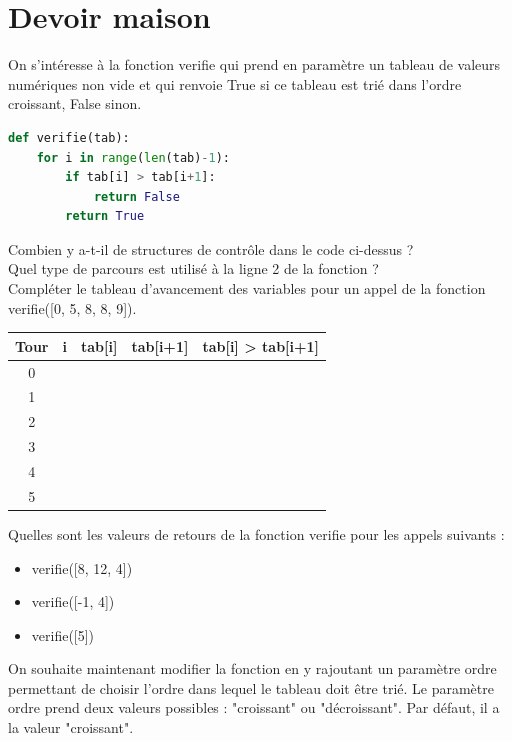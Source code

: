 \section*{Devoir maison }

On s'intéresse à la fonction verifie qui prend en paramètre un tableau de valeurs numériques non vide et qui renvoie True si ce tableau est trié dans l’ordre croissant, False sinon.

\begin{lstlisting}[language=Python]
def verifie(tab):
    for i in range(len(tab)-1):
        if tab[i] > tab[i+1]:
            return False
        return True
\end{lstlisting}

\begin{Exercise}[title={Vérification tri}]
\Question Combien y a-t-il de structures de contrôle dans le code ci-dessus ?\\

\Question Quel type de parcours est utilisé à la ligne 2 de la fonction ?\\
\Question Compléter le tableau d'avancement des variables pour un appel de la fonction verifie([0, 5, 8, 8, 9]).\\

\begin{center}
\large
\begin{tabular}{c|c|c|c|c|}
\textbf{Tour} & \textbf{i} & \textbf{tab[i]} & \textbf{tab[i+1]} & \textbf{tab[i] > tab[i+1]}  \\
\hline
0 &  &  &  & \\
1 &  &  &  & \\
2 &  &  &  & \\
3 &  &  &  & \\
4 &  &  &  & \\
5 &  &  &  & \\
\end{tabular}
\end{center}

\Question Quelles sont les valeurs de retours de la fonction verifie pour les appels suivants : \\
\begin{itemize}
    \item verifie([8, 12, 4])
    \item verifie([-1, 4])
    \item verifie([5])
\end{itemize}

On souhaite maintenant modifier la fonction en y rajoutant un paramètre ordre permettant de choisir l'ordre dans lequel le tableau doit être trié. Le paramètre ordre prend deux valeurs possibles : "croissant" ou "décroissant". Par défaut, il a la valeur "croissant".\\


\end{Exercise}
